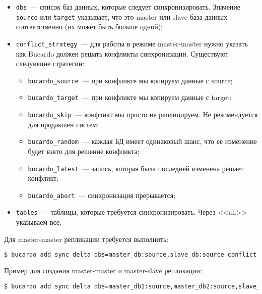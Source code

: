 \begin{itemize}
  \item \lstinline!dbs!~--- список баз данных, которые следует синхронизировать. Значение \lstinline!source! или \lstinline!target! указывает, что это master или slave база данных соответственно (их может быть больше одной);

  \item \lstinline!conflict_strategy!~--- для работы в режиме master-master нужно указать как Bucardo должен решать конфликты синхронизации. Существуют следующие стратегии:

  \begin{itemize}
    \item \lstinline!bucardo_source!~--- при конфликте мы копируем данные с source;
    \item \lstinline!bucardo_target!~--- при конфликте мы копируем данные с target;
    \item \lstinline!bucardo_skip!~--- конфликт мы просто не реплицируем. Не рекомендуется для продакшен систем;
    \item \lstinline!bucardo_random!~--- каждая БД имеет одинаковый шанс, что её изменение будет взято для решение конфликта;
    \item \lstinline!bucardo_latest!~--- запись, которая была последней изменена решает конфликт;
    \item \lstinline!bucardo_abort!~--- синхронизация прерывается;
  \end{itemize}

  \item \lstinline!tables!~--- таблицы, которые требуется синхронизировать. Через <<all>> указываем все;
\end{itemize}

Для master-master репликации требуется выполнить:

\begin{lstlisting}[language=Bash,label=lst:bucardo10,caption=Настройка репликации]
$ bucardo add sync delta dbs=master_db:source,slave_db:source conflict_strategy=bucardo_latest tables=all
\end{lstlisting}

Пример для создания master-master и master-slave репликации:

\begin{lstlisting}[language=Bash,label=lst:bucardo-master-slave1,caption=Настройка репликации]
$ bucardo add sync delta dbs=master_db1:source,master_db2:source,slave_db1:target,slave_db2:target conflict_strategy=bucardo_latest tables=all
\end{lstlisting}

